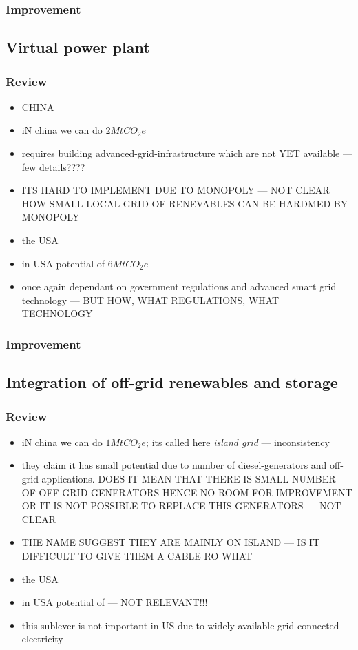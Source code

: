 \documentclass[11pt, twocolumn]{article}
\begin{document}
\subsubsection{Improvement}

\subsection{Virtual power plant}
\subsubsection{Review}
\begin{itemize}
\item CHINA
\item iN china we can do $2 Mt CO_2e$
\item requires building advanced-grid-infrastructure which are not YET available --- few details????
\item ITS HARD TO IMPLEMENT DUE TO MONOPOLY --- NOT CLEAR HOW SMALL LOCAL GRID OF RENEVABLES CAN BE HARDMED BY MONOPOLY

\item the USA
\item in USA potential of $6 MtCO_2e$
\item once again dependant on government regulations and advanced smart grid technology --- BUT HOW, WHAT REGULATIONS, WHAT TECHNOLOGY

\end{itemize}
\subsubsection{Improvement}

\subsection{Integration of off-grid renewables and storage}
\subsubsection{Review}
\begin{itemize}
\item iN china we can do $1 Mt CO_2e$; its called here \emph{island grid} --- inconsistency
\item they claim it has small potential due to number of diesel-generators and off-grid applications. DOES IT MEAN THAT THERE IS SMALL NUMBER OF OFF-GRID GENERATORS HENCE NO ROOM FOR IMPROVEMENT OR IT IS NOT POSSIBLE TO REPLACE THIS GENERATORS --- NOT CLEAR
\item THE NAME SUGGEST THEY ARE MAINLY ON ISLAND --- IS IT DIFFICULT TO GIVE THEM A CABLE RO WHAT

\item the USA
\item in USA potential of --- NOT RELEVANT!!!
\item this sublever is not important in US due to widely available grid-connected electricity

\end{itemize}
\end{document}
